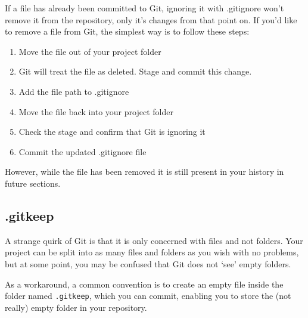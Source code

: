 \documentclass[
  letterpaper,
  DIV=11,
  numbers=noendperiod]{scrartcl}
\providecommand{\tightlist}{%
  \setlength{\itemsep}{0pt}\setlength{\parskip}{0pt}}\usepackage{longtable,booktabs,array}
\begin{document}
If a file has already been committed to Git, ignoring it with .gitignore
won't remove it from the repository, only it's changes from that point
on. If you'd like to remove a file from Git, the simplest way is to
follow these steps:

\begin{enumerate}
\def\labelenumi{\arabic{enumi}.}
\tightlist
\item
  Move the file out of your project folder
\item
  Git will treat the file as deleted. Stage and commit this change.
\item
  Add the file path to .gitignore
\item
  Move the file back into your project folder
\item
  Check the stage and confirm that Git is ignoring it
\item
  Commit the updated .gitignore file
\end{enumerate}

However, while the file has been removed it is still present in your
history in future sections.

\subsection{.gitkeep}\label{gitkeep}

A strange quirk of Git is that it is only concerned with files and not
folders. Your project can be split into as many files and folders as you
wish with no problems, but at some point, you may be confused that Git
does not `see' empty folders.

As a workaround, a common convention is to create an empty file inside
the folder named \texttt{.gitkeep}, which you can commit, enabling you
to store the (not really) empty folder in your repository.
\end{document}
